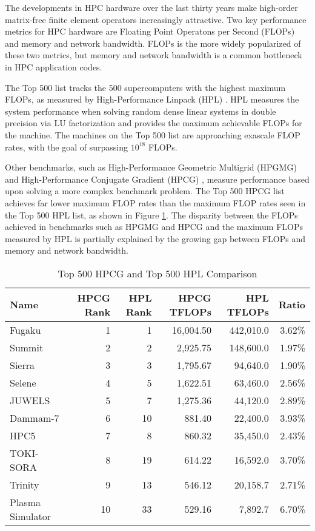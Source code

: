 The developments in HPC hardware over the last thirty years make high-order matrix-free finite element operators increasingly attractive.
Two key performance metrics for HPC hardware are Floating Point Operatons per Second (FLOPs) and memory and network bandwidth.
FLOPs is the more widely popularized of these two metrics, but memory and network bandwidth is a common bottleneck in HPC application codes. 

The Top 500 \cite{meuertop500} list tracks the 500 supercomputers with the highest maximum FLOPs, as measured by High-Performance Linpack (HPL) \cite{petitethpl}.
HPL measures the system performance when solving random dense linear systems in double precision via LU factorization and provides the maximum achievable FLOPs for the machine.
The machines on the Top 500 list are approaching exascale FLOP rates, with the goal of surpassing $10^{18}$ FLOPs.

Other benchmarks, such as High-Performance Geometric Multigrid (HPGMG) \cite{adams2014hpgmg} and High-Performance Conjugate Gradient (HPCG) \cite{dongarra2016high}, measure performance based upon solving a more complex benchmark problem.
The Top 500 \cite{meuertop500} HPCG list achieves far lower maximum FLOP rates than the maximum FLOP rates seen in the Top 500 HPL list, as shown in Figure \ref{table:top500}.
The disparity between the FLOPs achieved in benchmarks such as HPGMG and HPCG and the maximum FLOPs measured by HPL is partially explained by the growing gap between FLOPs and memory and network bandwidth.

\begin{table}[ht!]
\begin{center}
\begin{tabular}{l r r r r r}
  \toprule
  Name & HPCG Rank & HPL Rank & HPCG TFLOPs & HPL TFLOPs & Ratio \\
  \midrule
  Fugaku           &  1 &  1 & 16,004.50 & 442,010.0 & 3.62\% \\
  Summit           &  2 &  2 &  2,925.75 & 148,600.0 & 1.97\% \\
  Sierra           &  3 &  3 &  1,795.67 &  94,640.0 & 1.90\% \\
  Selene           &  4 &  5 &  1,622.51 &  63,460.0 & 2.56\% \\
  JUWELS           &  5 &  7 &  1,275.36 &  44,120.0 & 2.89\% \\
  Dammam-7         &  6 & 10 &    881.40 &  22,400.0 & 3.93\% \\
  HPC5             &  7 &  8 &    860.32 &  35,450.0 & 2.43\% \\
  TOKI-SORA        &  8 & 19 &    614.22 &  16,592.0 & 3.70\% \\
  Trinity          &  9 & 13 &    546.12 &  20,158.7 & 2.71\% \\
  Plasma Simulator & 10 & 33 &    529.16 &   7,892.7 & 6.70\% \\
  \bottomrule
\end{tabular}
\end{center}
\caption{Top 500 HPCG and Top 500 HPL Comparison}
\label{table:top500}
\end{table}

